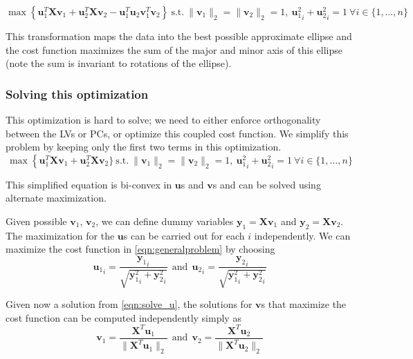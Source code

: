 \documentclass[10pt,a4paper]{article}
\newcommand{\bu}{\mathbf{u}}
\newcommand{\bv}{\mathbf{v}}
\begin{document}
\begin{equation}
\max \left\{\mathbf{u}_1^T \mathbf{X} \mathbf{v}_1 + \mathbf{u}_2^T \mathbf{X} \mathbf{v}_2 - \bu_1^T\bu_2\bv_1^T\bv_2\right\} ~\textrm{s.t.}~ \|\mathbf{v}_1\|_2 = \|\mathbf{v}_2\|_2=1,~ {\mathbf{u}_1^2}_i + {\mathbf{u}_2^2}_i = 1~ \forall i\in \{1,\ldots,n\}
\label{eqn:generalproblem}
\end{equation}

This transformation maps the data into the best possible approximate ellipse and the cost function maximizes the sum of the major and minor axis of this ellipse (note the sum is invariant to rotations of the ellipse).

\subsubsection*{Solving this optimization}
This optimization is hard to solve; we need to either enforce orthogonality between the LVs or PCs, or optimize this coupled cost function. We simplify this problem  by keeping only the first two terms in this optimization. 
\begin{equation}
\max \left\{\mathbf{u}_1^T \mathbf{X} \mathbf{v}_1 + \mathbf{u}_2^T \mathbf{X} \mathbf{v}_2 \} ~\textrm{s.t.}~ \|\mathbf{v}_1\|_2 = \|\mathbf{v}_2\|_2=1,~ {\mathbf{u}_1^2}_i + {\mathbf{u}_2^2}_i = 1~ \forall i\in \{1,\ldots,n\}
\end{equation}

This simplified equation is bi-convex in $\textbf{u}$s and $\textbf{v}$s  and can be solved using alternate maximization.

Given possible $\mathbf{v}_1$, $\mathbf{v}_2$, we can define dummy variables $\mathbf{y}_1 = \mathbf{X}\mathbf{v}_1$ and $\mathbf{y}_2 = \mathbf{X}\mathbf{v}_2$. The maximization for the $\mathbf{u}$s can be carried out for each $i$ independently. We can maximize the cost function in \eqref{eqn:generalproblem} by choosing
\begin{equation}
{\mathbf{u}_1}_i = \frac{{\mathbf{y}_1}_i}{\sqrt{{\mathbf{y}_1^2}_i + {\mathbf{y}_2^2}_i}} ~~\textrm{and}~~ {\mathbf{u}_2}_i = \frac{{\mathbf{y}_2}_i}{\sqrt{{\mathbf{y}_1^2}_i + {\mathbf{y}_2^2}_i}}
\label{eqn:solve_u}
\end{equation}

Given now a solution from \eqref{eqn:solve_u}, the solutions for $\mathbf{v}$s that maximize the cost function can be computed independently simply as
\begin{equation}
 \mathbf{v}_1 = \frac{\mathbf{X}^T\mathbf{u}_1}{\|\mathbf{X}^T\mathbf{u}_1\|_2} ~~\textrm{and}~~ \mathbf{v}_2 = \frac{\mathbf{X}^T\mathbf{u}_2}{\|\mathbf{X}^T\mathbf{u}_2\|_2}
 \label{eqn:solve_v}
 \end{equation} 
 
\end{document}
